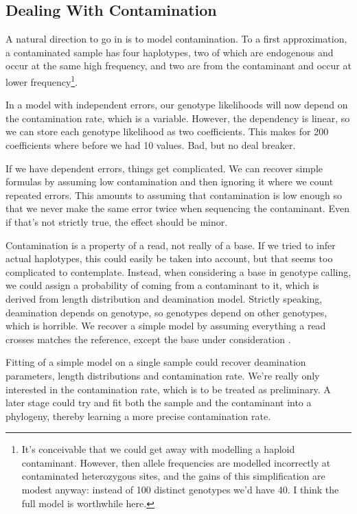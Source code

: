 \documentclass{article}
\begin{document}
\subsection{Dealing With Contamination}

A natural direction to go in is to model contamination.  To a first
approximation, a contaminated sample has four haplotypes, two of which
are endogenous and occur at the same high frequency, and two are from
the contaminant and occur at lower frequency\footnote{It's conceivable
that we could get away with modelling a haploid contaminant.  However,
then allele frequencies are modelled incorrectly at contaminated
heterozygous sites, and the gains of this simplification are modest
anyway:  instead of 100 distinct genotypes we'd have 40.  I think the
full model is worthwhile here.}.

In a model with independent errors, our genotype likelihoods will now
depend on the contamination rate, which is a variable.  However, the
dependency is linear, so we can store each genotype
likelihood as two coefficients.  This makes for 200 coefficients where
before we had 10 values.  Bad, but no deal breaker.

If we have dependent errors, things get complicated.  We can recover
simple formulas by assuming low contamination and then ignoring it where
we count repeated errors.  This amounts to assuming that contamination
is low enough so that we never make the same error twice when sequencing
the contaminant.  Even if that's not strictly true, the effect should be
minor.

Contamination is a property of a read, not really of a base.  If we
tried to infer actual haplotypes, this could easily be taken into
account, but that seems too complicated to contemplate.  Instead, when
considering a base in genotype calling, we could assign a probability of
coming from a contaminant to it, which is derived from length
distribution and deamination model.  Strictly speaking, deamination
depends on genotype, so genotypes depend on other genotypes, which is
horrible.  We recover a simple model by assuming everything a read
crosses matches the reference, except the base under consideration
.

Fitting of a simple model on a single sample could recover deamination
parameters, length distributions and contamination rate.  We're really
only interested in the contamination rate, which is to be treated as
preliminary.  A later stage could try and fit both the sample and the
contaminant into a phylogeny, thereby learning a more precise
contamination rate.
\end{document}
